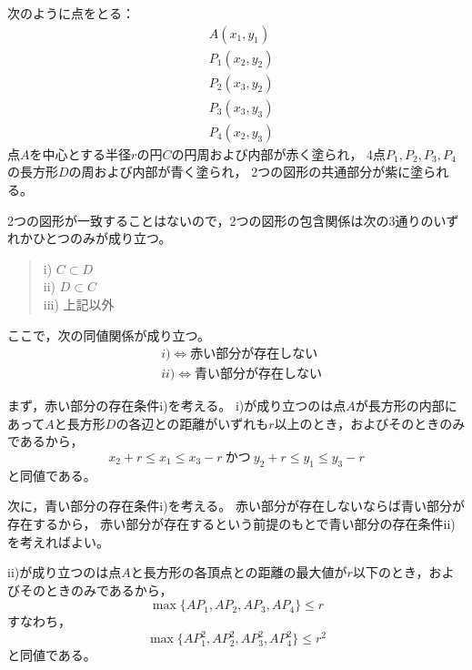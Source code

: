\documentclass{article}
\begin{document}
次のように点をとる：
\begin{eqnarray*}
    &A(x_1, y_1) \\
    &P_1(x_2, y_2) \\
    &P_2(x_3, y_2) \\
    &P_3(x_3, y_3) \\
    &P_4(x_2, y_3)
\end{eqnarray*}
点$A$を中心とする半径$r$の円$C$の円周および内部が赤く塗られ，
4点$P_1, P_2, P_3, P_4$の長方形$D$の周および内部が青く塗られ，
2つの図形の共通部分が紫に塗られる。

2つの図形が一致することはないので，2つの図形の包含関係は次の3通りのいずれかひとつのみが成り立つ。
\begin{quote}
    i) $C \subset D$ \\
    ii) $D \subset C$ \\
    iii) 上記以外
\end{quote}

ここで，次の同値関係が成り立つ。
\begin{eqnarray*}
    &i) \Longleftrightarrow \mbox{赤い部分が存在しない} \\
    &ii) \Longleftrightarrow \mbox{青い部分が存在しない}
\end{eqnarray*}

まず，赤い部分の存在条件i)を考える。
i)が成り立つのは点$A$が長方形の内部にあって$A$と長方形$D$の各辺との距離がいずれも$r$以上のとき，およびそのときのみであるから，
\[
    x_2 + r \leq x_1 \leq x_3 - r \ \mbox{かつ} \
    y_2 + r \leq y_1 \leq y_3 - r
\]
と同値である。

次に，青い部分の存在条件i)を考える。
赤い部分が存在しないならば青い部分が存在するから，
赤い部分が存在するという前提のもとで青い部分の存在条件ii)を考えればよい。

ii)が成り立つのは点$A$と長方形の各頂点との距離の最大値が$r$以下のとき，およびそのときのみであるから，
\[
    \max \{ AP_1, AP_2, AP_3, AP_4 \} \leq r
\]
すなわち，
\[
    \max \{ AP_1^2, AP_2^2, AP_3^2, AP_4^2 \} \leq r^2
\]
と同値である。
\end{document}
